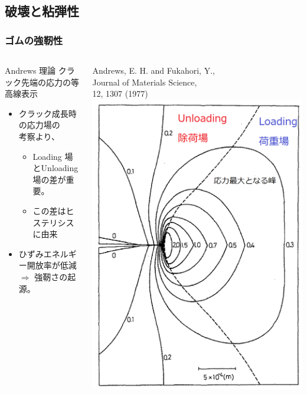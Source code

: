\documentclass[12pt, dvipdfmx]{beamer}
\begin{document}
\subsection{破壊と粘弾性}
\begin{frame}
	\frametitle{ゴムの強靭性}
		\begin{columns}[totalwidth=\textwidth]
				\begin{exampleblock}{Andrews 理論}
					クラック先端の応力の等高線表示
					\begin{itemize}
						\item クラック成長時の応力場の\\考察より、
							\begin{itemize}
								\item {\color{red} Loading 場とUnloading 場の差}が重要。
								\item この差は\alert{ヒステリシスに由来}
							\end{itemize}	
						\item \alert{ひずみエネルギー開放率が低減} \\$\Rightarrow$ 強靭さの起源。
					\end{itemize}
				\end{exampleblock}
				{Andrews, E. H. and Fukahori, Y., \\Journal of Materials Science, \\12, 1307 (1977)}
			\includegraphics[width=\textwidth]{crack.png}
		\end{columns}
\end{frame}
\end{document}
